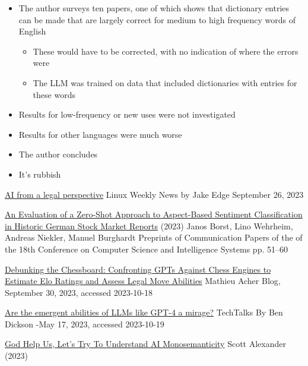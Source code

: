 \documentclass[25pt,a4paper,landscape,headrule,footrule,xetex]{foils}
\begin{document}

\begin{itemize}\addtolength{\itemsep}{-1ex}
\item The author surveys ten papers, one of which shows that dictionary entries can be made that are largely correct for medium to high frequency words of English
  \begin{itemize}
  \item These would have to be corrected, with no indication of where the errors were
  \item The LLM was trained on data that included dictionaries with entries for these words
  \end{itemize}
\item Results for low-frequency or new uses were not investigated
\item Results for other languages were much worse
\item The author concludes 
\item It's rubbish
\end{itemize}




\href{https://lwn.net/Articles/945504/}{AI from a legal perspective} Linux Weekly News by Jake Edge September 26, 2023


\href{https://annals-csis.org/proceedings/2023/pliks/3725.pdf}{An Evaluation of a Zero-Shot Approach to
Aspect-Based Sentiment Classification in Historic
German Stock Market Reports} (2023) Janos Borst, Lino Wehrheim, Andreas Niekler, Manuel Burghardt
Preprints of Communication Papers of the of the 18th Conference on Computer
Science and Intelligence Systems pp. 51–60

\href{https://blog.mathieuacher.com/GPTsChessEloRatingLegalMoves/}{Debunking the Chessboard: Confronting GPTs Against Chess Engines to Estimate Elo Ratings and Assess Legal Move Abilities} 
Mathieu Acher Blog, September 30, 2023, accessed 2023-10-18

\href{https://bdtechtalks.com/2023/05/17/llm-emergent-abilities-mirage/}{Are the emergent abilities of LLMs like GPT-4 a mirage?} TechTalks
By Ben Dickson -May 17, 2023, accessed 2023-10-19

\href{https://www.astralcodexten.com/p/god-help-us-lets-try-to-understand}{God Help Us, Let's Try To Understand AI Monosemanticity} Scott Alexander (2023)
\end{document}
